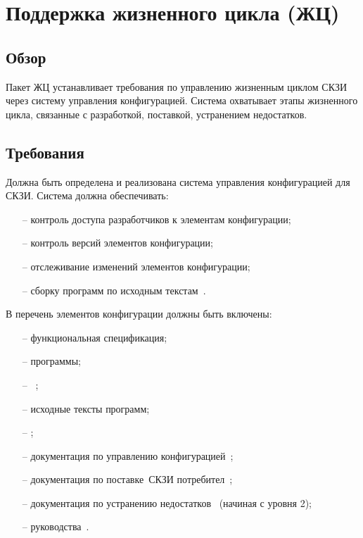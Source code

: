 \section{Поддержка жизненного цикла (ЖЦ)}\label{LC}

\subsection{Обзор}\label{LC.Intro}

Пакет ЖЦ устанавливает требования по управлению жизненным циклом СКЗИ
через систему управления конфигурацией. Система охватывает этапы жизненного 
цикла, связанные с разработкой, поставкой, устранением недостатков.

\subsection{Требования}\label{LC.Reqs}

\label{R.LC.CMSystem}
Должна быть определена и реализована система управления конфигурацией для СКЗИ.
Система должна обеспечивать:
\begin{itemize}
\item[--]
контроль доступа разработчиков к элементам конфигурации;
\item[--]
контроль версий элементов конфигурации;
\item[--]
отслеживание изменений элементов конфигурации;
\item[--]
сборку программ по исходным текстам~.
\end{itemize}

\label{R.LC.CMList}
В перечень элементов конфигурации должны быть включены:
\begin{itemize}
\item[--]
функциональная спецификация;
\item[--]
программы;
\item[--]
~;
\item[--]
исходные тексты программ;
\item[--]
;
\item[--]
документация по управлению конфигурацией~;
\item[--]
документация по поставке~СКЗИ потребител~;
\item[--]
документация по устранению недостатков~
(начиная с уровня 2);
\item[--]
руководства~.
\end{itemize}


